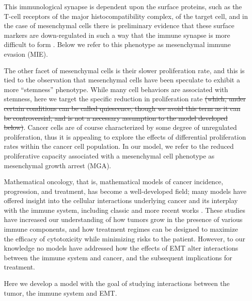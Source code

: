 \documentclass[11pt]{article}
\begin{document}
This immunological synapse is dependent upon the surface proteins, such as the T-cell receptors of the major histocompatibility complex, of the target cell, and in the case of mesenchymal cells there is preliminary evidence that these surface markers are down-regulated in such a way that the immune synapse is more difficult to form \cite{terry2017new}.
Below we refer to this phenotype as mesenchymal immune evasion (MIE).
\par
The other facet of mesenchymal cells is their slower proliferation rate, and this is tied to the observation that mesenchymal cells have been speculate to exhibit a more ``stemness'' phenotype.
While many cell behaviors are associated with stemness, here we target the specific reduction in proliferation rate \cite{woods2014effects} \sout{(which, under certain conditions can be called quiescence, though we avoid this term as it can be controversial, and is not a necessary assumption to the model developed below)}.
Cancer cells are of course characterized by some degree of unregulated proliferation, thus it is appealing to explore the effects of differential proliferation rates within the cancer cell population.
In our model, we refer to the reduced proliferative capacity associated with a mesenchymal cell phenotype as mesenchymal growth arrest (MGA).
\par
Mathematical oncology, that is, mathematical models of cancer incidence, progression, and treatment, has become a well-developed field; many models have offered insight into the cellular interactions underlying cancer and its interplay with the immune system, including classic \cite{anderson98_continuous, sherrattjonathana.92_oncogenes, pillis05_validated} and more recent works \cite{kim18_cell, gallaher14_bridging, gallaher18_spatial, an15_agentbased, serre16_mathematical, louzoun14_mathematical, briones-orta13_arkadia, lavi13_role, greene15_modeling, greene16_mathematical, cho17_modeling-1,  benzekry17_mathematical, owen11_mathematical, west18_multidrug}. These studies have increased our understanding of how tumors grow in the presence of various immune components, and how treatment regimes can be designed to maximize the efficacy of cytotoxicity while minimizing risks to the patient. However, to our knowledge no models have addressed how the effects of EMT alter interactions between the immune system and cancer, and the subsequent implications for treatment. 
\par
Here we develop a model with the goal of studying interactions between the tumor, the immune system and EMT.
\end{document}
